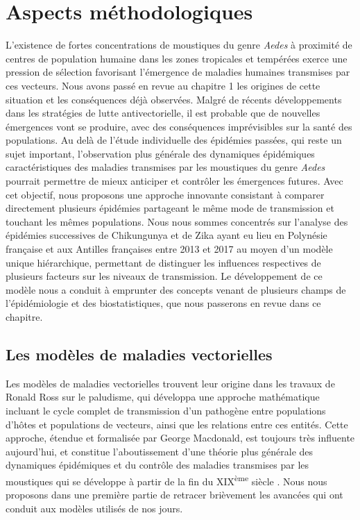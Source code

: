 \chapter{Aspects méthodologiques}
\chaptermark{}

L'existence de fortes concentrations de moustiques du genre {\em Aedes} à proximité de centres de population humaine dans les zones tropicales et tempérées exerce une pression de sélection favorisant l'émergence de maladies humaines transmises par ces vecteurs.
Nous avons passé en revue au chapitre 1 les origines de cette situation et les conséquences déjà observées.
Malgré de récents développements dans les stratégies de lutte antivectorielle, il est probable que de nouvelles émergences vont se produire, avec des conséquences imprévisibles sur la santé des populations.
Au delà de l'étude individuelle des épidémies passées, qui reste un sujet important, l'observation plus générale des dynamiques épidémiques caractéristiques des maladies transmises par les moustiques du genre {\em Aedes} pourrait permettre de mieux anticiper et contrôler les émergences futures.
Avec cet objectif, nous proposons une approche innovante consistant à comparer directement plusieurs épidémies partageant le même mode de transmission et touchant les mêmes populations.
Nous nous sommes concentrés sur l'analyse des épidémies successives de Chikungunya et de Zika ayant eu lieu en Polynésie française et aux Antilles françaises entre 2013 et 2017 au moyen d'un modèle unique hiérarchique, permettant de distinguer les influences respectives de plusieurs facteurs sur les niveaux de transmission.
Le développement de ce modèle nous a conduit à emprunter des concepts venant de plusieurs champs de l'épidémiologie et des biostatistiques, que nous passerons en revue dans ce chapitre.

\section{Les modèles de maladies vectorielles}

Les modèles de maladies vectorielles trouvent leur origine dans les travaux de Ronald Ross sur le paludisme, qui développa une approche mathématique incluant le cycle complet de transmission d'un pathogène entre populations d'hôtes et populations de vecteurs, ainsi que les relations entre ces entités. 
Cette approche, étendue et formalisée par George Macdonald, est toujours très influente aujourd'hui, et constitue l'aboutissement d'une théorie plus générale des dynamiques épidémiques et du contrôle des maladies transmises par les moustiques qui se développe à partir de la fin du XIX\textsuperscript{ème} siècle \cite{smith2012ross}.
Nous nous proposons dans une première partie de retracer brièvement les avancées qui ont conduit aux modèles utilisés de nos jours.

